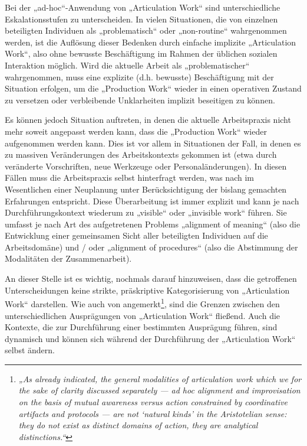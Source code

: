 Bei der „ad-hoc“-Anwendung von „Articulation Work“ sind unterschiedliche Eskalationsstufen zu unterscheiden. In vielen Situationen, die von einzelnen beteiligten Individuen als „problematisch“ oder „non-routine“ wahrgenommen werden, ist die Auflösung dieser Bedenken durch einfache implizite „Articulation Work“, also ohne bewusste Beschäftigung im Rahmen der üblichen sozialen Interaktion möglich. Wird die aktuelle Arbeit als „problematischer“ wahrgenommen, muss eine explizite (d.h. bewusste) Beschäftigung mit der Situation erfolgen, um die „Production Work“ wieder in einen operativen Zustand zu versetzen oder verbleibende Unklarheiten implizit beseitigen zu können. 

Es können jedoch Situation auftreten, in denen die aktuelle Arbeitspraxis nicht mehr soweit angepasst werden kann, dass die „Production Work“ wieder aufgenommen werden kann. Dies ist vor allem in Situationen der Fall, in denen es zu massiven Veränderungen des Arbeitskontexts gekommen ist (etwa durch veränderte Vorschriften, neue Werkzeuge oder Personaländerungen). In diesen Fällen muss die Arbeitspraxis selbst hinterfragt werden, was nach \citep{Corbin93} im Wesentlichen einer Neuplanung unter Berücksichtigung der bislang gemachten Erfahrungen entspricht. Diese Überarbeitung ist immer explizit und kann je nach Durchführungskontext wiederum zu „visible“ oder „invisible work“ führen. Sie umfasst je nach Art des aufgetretenen Problems „alignment of meaning“ (also die Entwicklung einer gemeinsamen Sicht aller beteiligten Individuen auf die Arbeitsdomäne) und / oder „alignment of procedures“ (also die Abstimmung der Modalitäten der Zusammenarbeit).

An dieser Stelle ist es wichtig, nochmals darauf hinzuweisen, dass die getroffenen Unterscheidungen keine strikte, präskriptive Kategorisierung von „Articulation Work“ darstellen. Wie auch von \citet{Schmidt00} angemerkt\footnote{\emph{„As already indicated, the general modalities of articulation work which we for the sake of clarity discussed separately — ad hoc alignment and improvisation on the basis of mutual awareness versus action constrained by coordinative artifacts and protocols — are not ‘natural kinds’ in the Aristotelian sense: they do not exist as distinct domains of action, they are analytical distinctions.“}\citep[][S. 7]{Schmidt00}}, sind die Grenzen zwischen den unterschiedlichen Ausprägungen von „Articulation Work“ fließend. Auch die Kontexte, die zur Durchführung einer bestimmten Ausprägung führen, sind dynamisch und können sich während der Durchführung der „Articulation Work“ selbst ändern.

